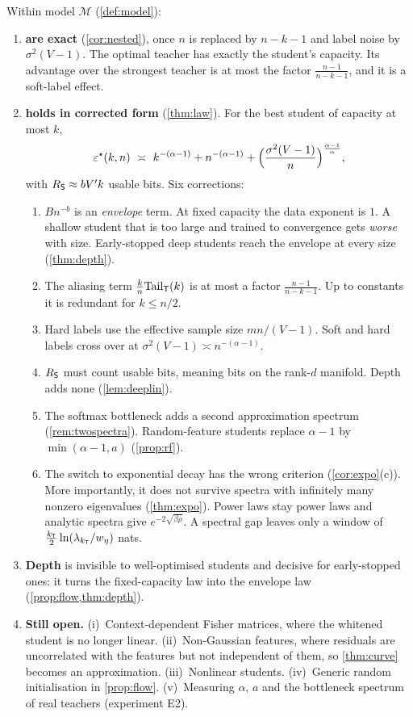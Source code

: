 Within model $\mathcal M$ (\cref{def:model}):
\begin{enumerate}[label=\arabic*.,leftmargin=*]
\item \textbf{ are exact} (\cref{cor:nested}), once $n$ is replaced by $n-k-1$ and label noise by
$\sigma^2(V-1)$. The optimal teacher has exactly the student's capacity. Its advantage over the strongest teacher
is at most the factor $\frac{n-1}{n-k-1}$, and it is a soft-label effect.
\item \textbf{ holds in corrected form} (\cref{thm:law}). For the best student of capacity at most $k$,
\[
\eps^\star(k,n)\ \asymp\ k^{-(\alpha-1)}+n^{-(\alpha-1)}+\Big(\frac{\sigma^2(V-1)}n\Big)^{\frac{\alpha-1}\alpha},
\]
with $R_{\mathsf{S}}\approx bV'k$ usable bits. Six corrections:
\begin{enumerate}[label=(\alph*),nosep]
\item $Bn^{-b}$ is an \emph{envelope} term. At fixed capacity the data exponent is $1$. A shallow student that is
too large and trained to convergence gets \emph{worse} with size. Early-stopped deep students reach the
envelope at every size (\cref{thm:depth}).
\item The aliasing term $\frac kn\mathrm{Tail}_{\mathsf{T}}(k)$ is at most a factor $\frac{n-1}{n-k-1}$. Up to constants it is redundant for
$k\le n/2$.
\item Hard labels use the effective sample size $mn/(V-1)$. Soft and hard labels cross over at
$\sigma^2(V-1)\asymp n^{-(\alpha-1)}$.
\item $R_{\mathsf{S}}$ must count usable bits, meaning bits on the rank-$d$ manifold. Depth adds none (\cref{lem:deeplin}).
\item The softmax bottleneck adds a second approximation spectrum (\cref{rem:twospectra}). Random-feature
students replace $\alpha-1$ by $\min(\alpha-1,a)$ (\cref{prop:rf}).
\item The switch to exponential decay has the wrong criterion (\cref{cor:expo}(c)). More importantly, it does not
survive spectra with infinitely many nonzero eigenvalues (\cref{thm:expo}). Power laws stay power laws and
analytic spectra give $e^{-2\sqrt{\beta\rho}}$. A spectral gap leaves only a window of $\frac{k_{\mathsf{T}}}2\ln(\lambda_{k_{\mathsf{T}}}/w_\eta)$ nats.
\end{enumerate}
\item \textbf{Depth} is invisible to well-optimised students and decisive for early-stopped ones: it
turns the fixed-capacity law into the envelope law (\cref{prop:flow,thm:depth}).
\item \textbf{Still open.} (i)~Context-dependent Fisher matrices, where the whitened student is no longer linear.
(ii)~Non-Gaussian features, where residuals are uncorrelated with the features but not independent of
them, so \cref{thm:curve} becomes an approximation. (iii)~Nonlinear students. (iv)~Generic random
initialisation in \cref{prop:flow}. (v)~Measuring $\alpha$, $a$ and the bottleneck spectrum of real teachers
(experiment E2).
\end{enumerate}
